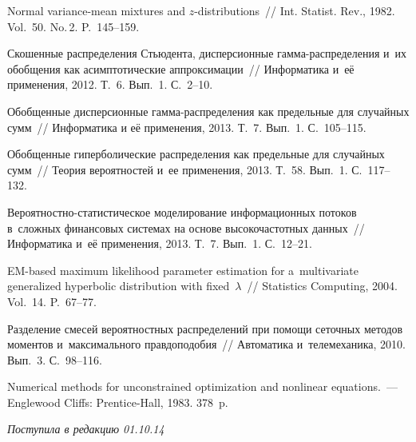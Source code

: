 \begin{multicols}{2}
{{\begin{thebibliography}{99}
 Normal
variance-mean mixtures and $z$-distributions~// Int. Statist. Rev.,
1982. Vol.~50. No.\,2. P.~145--159.

 Скошенные распределения
Стьюдента, дисперсионные гам\-ма-рас\-пре\-де\-ле\-ния и~их обобщения как
асимптотические аппроксимации~// Информатика и~её применения, 2012.
Т.~6. Вып.~1. С.~2--10.

 Обобщенные дисперсионные
гам\-ма-рас\-пре\-де\-ле\-ния как предельные для случайных сумм~// Информатика
и её применения, 2013. Т.~7. Вып.~1. С.~105--115.

 Обобщенные гиперболические
распределения как предельные для случайных сумм~// Тео\-рия
вероятностей и~ее применения, 2013. Т.~58. Вып.~1. С.~117--132.

 Ве\-ро\-ят\-но\-ст\-но-ста\-ти\-сти\-че\-ское моделирование
информационных потоков в~сложных финансовых системах на основе
высокочастотных данных~// Информатика и~её применения, 2013. Т.~7.
Вып.~1. С.~12--21.

 EM-based maximum likelihood parameter
estimation for a~multivariate generalized hyperbolic distribution
with fixed~$\lambda$~// Statistics Computing, 2004. Vol.~14.
P.~67--77.

 Разделение смесей
вероятностных распределений при помощи сеточных методов моментов и~максимального правдоподобия~//
Автоматика и~телемеханика, 2010. Вып.~3. С.~98--116.

 Numerical methods for
unconstrained optimization and nonlinear equations.~--- Englewood
Cliffs: Prentice-Hall, 1983. 378~p.
 \end{thebibliography}

 }
 }

\end{multicols}

\vspace*{-6pt}

\hfill{\small\textit{Поступила в редакцию 01.10.14}}

\newpage


